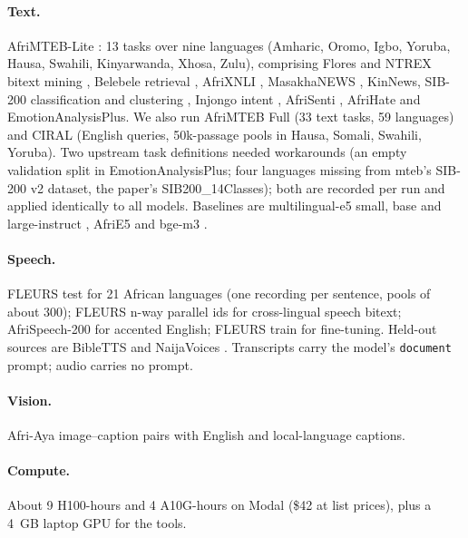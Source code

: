 \documentclass[conference]{IEEEtran}
\begin{document}
\paragraph{Text.}
AfriMTEB-Lite \cite{uemura2026afrimteb}: 13 tasks over nine languages
(Amharic, Oromo, Igbo, Yoruba, Hausa, Swahili, Kinyarwanda, Xhosa, Zulu),
comprising Flores and NTREX bitext mining \cite{nllb2022,federmann2022ntrex},
Belebele retrieval \cite{bandarkar2024belebele}, AfriXNLI
\cite{adelani2024irokobench}, MasakhaNEWS \cite{adelani2023masakhanews},
KinNews, SIB-200 classification and clustering \cite{adelani2024sib200},
Injongo intent \cite{yu2025injongo}, AfriSenti \cite{muhammad2023afrisenti},
AfriHate \cite{muhammad2025afrihate} and EmotionAnalysisPlus. We also run
AfriMTEB Full (33 text tasks, 59 languages) and CIRAL \cite{adeyemi2024ciral}
(English queries, 50k-passage pools in Hausa, Somali, Swahili, Yoruba). Two
upstream task definitions needed workarounds (an empty validation split in
EmotionAnalysisPlus; four languages missing from mteb's SIB-200 v2 dataset, the paper's SIB200\_14Classes); both
are recorded per run and applied identically to all models. Baselines are
multilingual-e5 small, base and large-instruct \cite{wang2024multilinguale5},
AfriE5 \cite{uemura2026afrimteb} and bge-m3 \cite{chen2024bgem3}.

\paragraph{Speech.}
FLEURS \cite{conneau2023fleurs} test for 21 African languages (one recording
per sentence, pools of about 300); FLEURS n-way parallel ids for cross-lingual
speech bitext; AfriSpeech-200 \cite{olatunji2023afrispeech} for accented
English; FLEURS train for fine-tuning. Held-out sources are BibleTTS
\cite{meyer2022bibletts} and NaijaVoices \cite{naijavoices2025}. Transcripts
carry the model's \texttt{document} prompt; audio carries no prompt.

\paragraph{Vision.}
Afri-Aya \cite{afriaya2025} image--caption pairs with English and
local-language captions.

\paragraph{Compute.}
About 9 H100-hours and 4 A10G-hours on Modal (\$42 at list prices),
plus a 4~GB laptop GPU for the tools.
\end{document}
